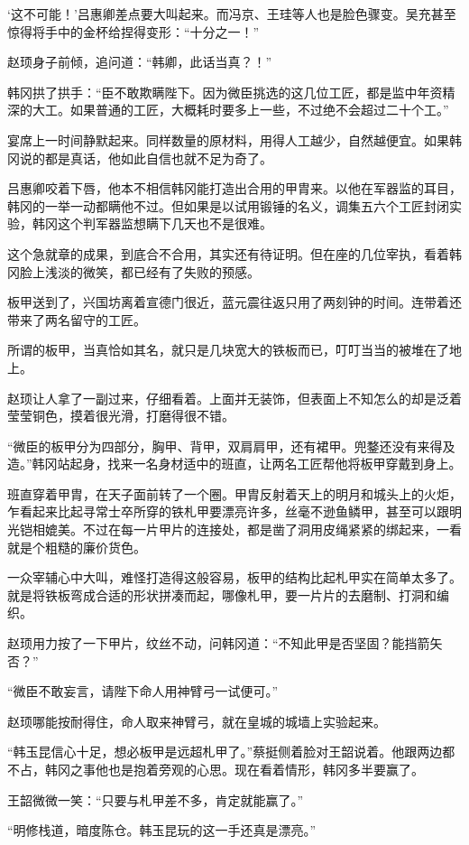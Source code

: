 ‘这不可能！’吕惠卿差点要大叫起来。而冯京、王珪等人也是脸色骤变。吴充甚至惊得将手中的金杯给捏得变形：“十分之一！”

赵顼身子前倾，追问道：“韩卿，此话当真？！”

韩冈拱了拱手：“臣不敢欺瞒陛下。因为微臣挑选的这几位工匠，都是监中年资精深的大工。如果普通的工匠，大概耗时要多上一些，不过绝不会超过二十个工。”

宴席上一时间静默起来。同样数量的原材料，用得人工越少，自然越便宜。如果韩冈说的都是真话，他如此自信也就不足为奇了。

吕惠卿咬着下唇，他本不相信韩冈能打造出合用的甲胄来。以他在军器监的耳目，韩冈的一举一动都瞒他不过。但如果是以试用锻锤的名义，调集五六个工匠封闭实验，韩冈这个判军器监想瞒下几天也不是很难。

这个急就章的成果，到底合不合用，其实还有待证明。但在座的几位宰执，看着韩冈脸上浅淡的微笑，都已经有了失败的预感。

板甲送到了，兴国坊离着宣德门很近，蓝元震往返只用了两刻钟的时间。连带着还带来了两名留守的工匠。

所谓的板甲，当真恰如其名，就只是几块宽大的铁板而已，叮叮当当的被堆在了地上。

赵顼让人拿了一副过来，仔细看着。上面并无装饰，但表面上不知怎么的却是泛着莹莹铜色，摸着很光滑，打磨得很不错。

“微臣的板甲分为四部分，胸甲、背甲，双肩肩甲，还有裙甲。兜鍪还没有来得及造。”韩冈站起身，找来一名身材适中的班直，让两名工匠帮他将板甲穿戴到身上。

班直穿着甲胄，在天子面前转了一个圈。甲胄反射着天上的明月和城头上的火炬，乍看起来比起寻常士卒所穿的铁札甲要漂亮许多，丝毫不逊鱼鳞甲，甚至可以跟明光铠相媲美。不过在每一片甲片的连接处，都是凿了洞用皮绳紧紧的绑起来，一看就是个粗糙的廉价货色。

一众宰辅心中大叫，难怪打造得这般容易，板甲的结构比起札甲实在简单太多了。就是将铁板弯成合适的形状拼凑而起，哪像札甲，要一片片的去磨制、打洞和编织。

赵顼用力按了一下甲片，纹丝不动，问韩冈道：“不知此甲是否坚固？能挡箭矢否？”

“微臣不敢妄言，请陛下命人用神臂弓一试便可。”

赵顼哪能按耐得住，命人取来神臂弓，就在皇城的城墙上实验起来。

“韩玉昆信心十足，想必板甲是远超札甲了。”蔡挺侧着脸对王韶说着。他跟两边都不占，韩冈之事他也是抱着旁观的心思。现在看着情形，韩冈多半要赢了。

王韶微微一笑：“只要与札甲差不多，肯定就能赢了。”

“明修栈道，暗度陈仓。韩玉昆玩的这一手还真是漂亮。”


